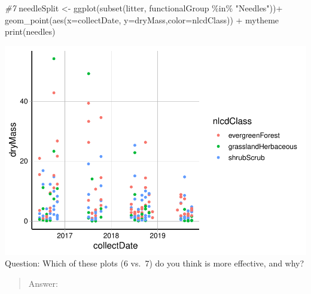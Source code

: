 \documentclass[
]{article}
\newenvironment{Shaded}{\begin{snugshade}}{\end{snugshade}}
\newcommand{\AttributeTok}[1]{\textcolor[rgb]{0.77,0.63,0.00}{#1}}
\newcommand{\CommentTok}[1]{\textcolor[rgb]{0.56,0.35,0.01}{\textit{#1}}}
\newcommand{\FunctionTok}[1]{\textcolor[rgb]{0.00,0.00,0.00}{#1}}
\newcommand{\NormalTok}[1]{#1}
\newcommand{\OtherTok}[1]{\textcolor[rgb]{0.56,0.35,0.01}{#1}}
\newcommand{\SpecialCharTok}[1]{\textcolor[rgb]{0.00,0.00,0.00}{#1}}
\newcommand{\StringTok}[1]{\textcolor[rgb]{0.31,0.60,0.02}{#1}}
\begin{document}
\begin{Shaded}
\begin{Highlighting}[]
\CommentTok{\#7}
\NormalTok{needleSplit }\OtherTok{\textless{}{-}} \FunctionTok{ggplot}\NormalTok{(}\FunctionTok{subset}\NormalTok{(litter, functionalGroup }\SpecialCharTok{\%in\%} \StringTok{"Needles"}\NormalTok{))}\SpecialCharTok{+}
  \FunctionTok{geom\_point}\NormalTok{(}\FunctionTok{aes}\NormalTok{(}\AttributeTok{x=}\NormalTok{collectDate, }\AttributeTok{y=}\NormalTok{dryMass,}\AttributeTok{color=}\NormalTok{nlcdClass)) }\SpecialCharTok{+}
\NormalTok{  mytheme}
\FunctionTok{print}\NormalTok{(needles)}
\end{Highlighting}
\end{Shaded}

\includegraphics{A05_DataVisualization_files/figure-latex/unnamed-chunk-5-2.pdf}
Question: Which of these plots (6 vs.~7) do you think is more effective,
and why?

\begin{quote}
Answer:
\end{quote}
\end{document}
